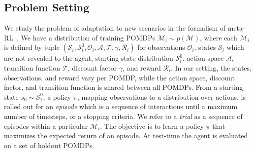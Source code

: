 \documentclass{article}
\begin{document}
\subsection{Problem Setting}
\label{sec:problem}
We study the problem of adaptation to new scenarios in the formalism of meta-RL~\citep{beck2023survey}.
We have a distribution of training POMDPs $ \mathcal{M}_i \sim p(\mathcal{M})$, where each $ \mathcal{M}_i $ is defined by tuple $ \left( \mathcal{S}_i, \mathcal{S}_i^{0}, \mathcal{O}_i, \mathcal{A}, \mathcal{T}, \gamma, \mathcal{R}_i \right) $ for observations $ \mathcal{O}_i$, states $ \mathcal{S}_i$ which are not revealed to the agent, starting state distribution $ \mathcal{S}_i^{0}$, action space $ \mathcal{A}$, transition function $ \mathcal{T}$, discount factor $ \gamma$, and reward $ \mathcal{R}_i$. In our setting, the states, observations, and reward vary per POMDP, while the action space, discount factor, and transition function is shared between all POMDPs.
From a starting state $ s_0 \sim \mathcal{S}_i^{0} $, a policy $ \pi$, mapping observations to a distribution over actions, is rolled out for an \emph{episode} which is a sequence of interactions until a maximum number of timesteps, or a stopping criteria.
We refer to a \emph{trial} as a sequence of episodes within a particular $ \mathcal{M}_i$. The objective is to learn a policy $ \pi $ that maximizes the expected return of an episode.
At test-time the agent is evaluated on a set of holdout POMDPs.
\end{document}
